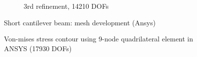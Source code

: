 \begin{figure}[h!]
\begin{subfigure}[b]{0.48\linewidth}
{        }
        \caption{3rd refinement, 14210 DOFs}
    \end{subfigure}
    \caption{Short cantilever beam: mesh development (Ansys)}
    \label{adap_fig:ex_short_cantilever_mesh_develpment_ansys}
\end{figure}

\begin{figure}
    \centering
    \caption{Von-mises stress contour using 9-node quadrilateral element in ANSYS (17930 DOFs)}
    \label{adap_fig:ex_chole_stress_ansys}
\end{figure}
\pagebreak